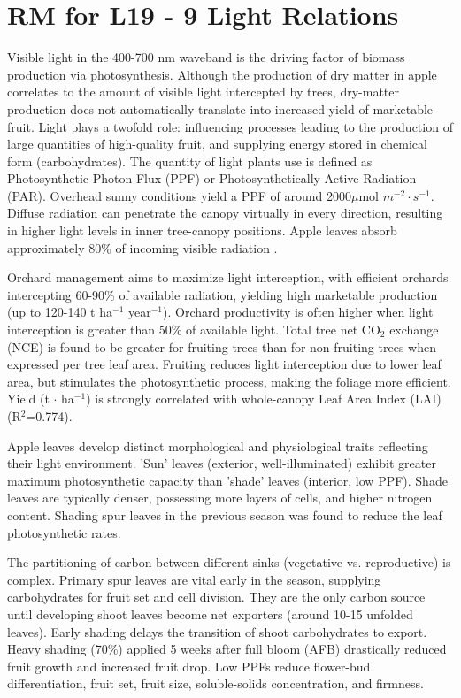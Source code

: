 \section{RM for L19 - 9 Light Relations}

Visible light in the 400-700 nm waveband is the driving factor of biomass production via photosynthesis. Although the production of dry matter in apple correlates to the amount of visible light intercepted by trees, dry-matter production does not automatically translate into increased yield of marketable fruit. Light plays a twofold role: influencing processes leading to the production of large quantities of high-quality fruit, and supplying energy stored in chemical form (carbohydrates). The quantity of light plants use is defined as Photosynthetic Photon Flux (PPF) or Photosynthetically Active Radiation (PAR). Overhead sunny conditions yield a PPF of around 2000$\mu$mol $m^{-2} \cdot s^{-1}$. Diffuse radiation can penetrate the canopy virtually in every direction, resulting in higher light levels in inner tree-canopy positions. Apple leaves absorb approximately 80\% of incoming visible radiation \cite*{rm_11_L19_light_relations}.

\vspace{0.5em}
Orchard management aims to maximize light interception, with efficient orchards intercepting 60-90\% of available radiation, yielding high marketable production (up to 120-140 t ha$^{-1}$ year$^{-1}$). Orchard productivity is often higher when light interception is greater than 50\% of available light. Total tree net CO$_2$ exchange (NCE) is found to be greater for fruiting trees than for non-fruiting trees when expressed per tree leaf area. Fruiting reduces light interception due to lower leaf area, but stimulates the photosynthetic process, making the foliage more efficient. Yield (t $\cdot$ ha$^{-1}$) is strongly correlated with whole-canopy Leaf Area Index (LAI) (R$^2$=0.774).

\vspace{0.5em}
Apple leaves develop distinct morphological and physiological traits reflecting their light environment. 'Sun' leaves (exterior, well-illuminated) exhibit greater maximum photosynthetic capacity than 'shade' leaves (interior, low PPF). Shade leaves are typically denser, possessing more layers of cells, and higher nitrogen content. Shading spur leaves in the previous season was found to reduce the leaf photosynthetic rates.

\vspace{0.5em}
The partitioning of carbon between different sinks (vegetative vs. reproductive) is complex. Primary spur leaves are vital early in the season, supplying carbohydrates for fruit set and cell division. They are the only carbon source until developing shoot leaves become net exporters (around 10-15 unfolded leaves). Early shading delays the transition of shoot carbohydrates to export. Heavy shading (70\%) applied 5 weeks after full bloom (AFB) drastically reduced fruit growth and increased fruit drop. Low PPFs reduce flower-bud differentiation, fruit set, fruit size, soluble-solids concentration, and firmness.

